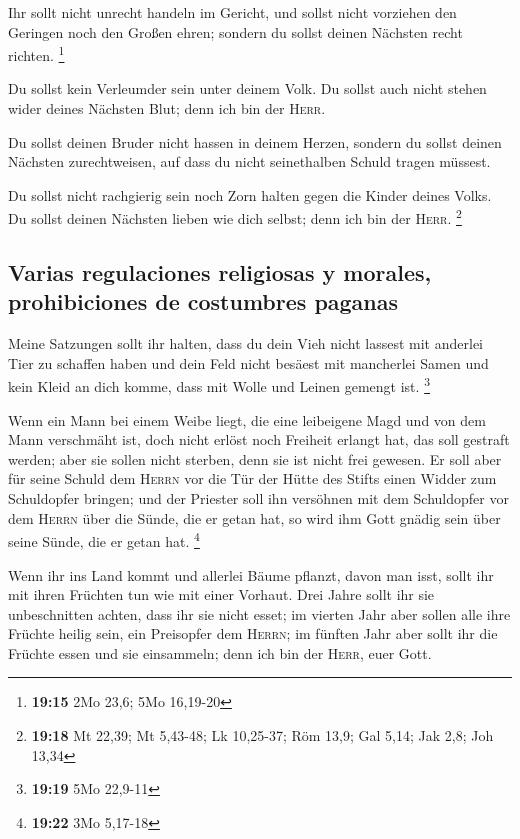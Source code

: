  Ihr sollt nicht unrecht handeln im Gericht, und sollst
nicht vorziehen den Geringen noch den Großen ehren; sondern du sollst
deinen Nächsten recht richten. \footnote{\textbf{19:15} 2Mo 23,6; 5Mo
  16,19-20}

 Du sollst kein Verleumder sein unter deinem Volk. Du
sollst auch nicht stehen wider deines Nächsten Blut; denn ich bin der
\textsc{Herr}.

 Du sollst deinen Bruder nicht hassen in deinem Herzen,
sondern du sollst deinen Nächsten zurechtweisen, auf dass du nicht
seinethalben Schuld tragen müssest.

 Du sollst nicht rachgierig sein noch Zorn halten gegen
die Kinder deines Volks. Du sollst deinen Nächsten lieben wie dich
selbst; denn ich bin der \textsc{Herr}. \footnote{\textbf{19:18} Mt
  22,39; Mt 5,43-48; Lk 10,25-37; Röm 13,9; Gal 5,14; Jak 2,8; Joh 13,34}

\hypertarget{varias-regulaciones-religiosas-y-morales-prohibiciones-de-costumbres-paganas}{%
\subsection{Varias regulaciones religiosas y morales, prohibiciones de
costumbres
paganas}\label{varias-regulaciones-religiosas-y-morales-prohibiciones-de-costumbres-paganas}}

 Meine Satzungen sollt ihr halten, dass du dein Vieh
nicht lassest mit anderlei Tier zu schaffen haben und dein Feld nicht
besäest mit mancherlei Samen und kein Kleid an dich komme, dass mit
Wolle und Leinen gemengt ist. \footnote{\textbf{19:19} 5Mo 22,9-11}

 Wenn ein Mann bei einem Weibe liegt, die eine leibeigene
Magd und von dem Mann verschmäht ist, doch nicht erlöst noch Freiheit
erlangt hat, das soll gestraft werden; aber sie sollen nicht sterben,
denn sie ist nicht frei gewesen.  Er soll aber für seine
Schuld dem \textsc{Herrn} vor die Tür der Hütte des Stifts einen Widder
zum Schuldopfer bringen;  und der Priester soll ihn
versöhnen mit dem Schuldopfer vor dem \textsc{Herrn} über die Sünde, die
er getan hat, so wird ihm Gott gnädig sein über seine Sünde, die er
getan hat. \footnote{\textbf{19:22} 3Mo 5,17-18}

 Wenn ihr ins Land kommt und allerlei Bäume pflanzt,
davon man isst, sollt ihr mit ihren Früchten tun wie mit einer Vorhaut.
Drei Jahre sollt ihr sie unbeschnitten achten, dass ihr sie nicht esset;
 im vierten Jahr aber sollen alle ihre Früchte heilig
sein, ein Preisopfer dem \textsc{Herrn};  im fünften Jahr
aber sollt ihr die Früchte essen und sie einsammeln; denn ich bin der
\textsc{Herr}, euer Gott.

